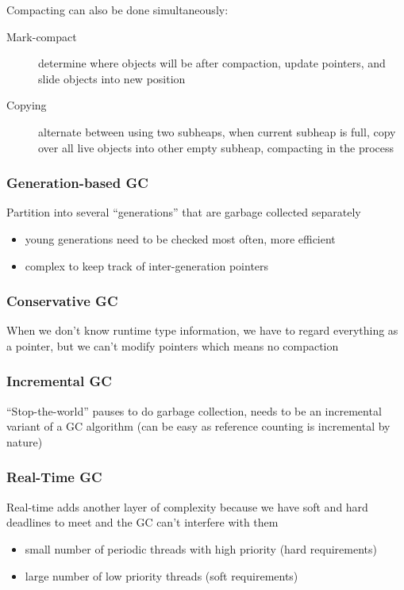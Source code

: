 \documentclass[]{article}
\theoremstyle{definition}
\begin{document}
	Compacting can also be done simultaneously:
	\begin{description}
		\item[Mark-compact] determine where objects will be after compaction, update pointers, and slide objects into new position
		\item[Copying] alternate between using two subheaps, when current subheap is full, copy over all live objects into other empty subheap, compacting in the process
	\end{description}

	\subsubsection{Generation-based GC}
	Partition into several ``generations'' that are garbage collected separately
	\begin{itemize}
		\item young generations need to be checked most often, more efficient
		\item complex to keep track of inter-generation pointers
	\end{itemize}

	\subsubsection{Conservative GC}
	When we don't know runtime type information, we have to regard everything as a pointer, but we can't modify pointers which means no compaction

	\subsubsection{Incremental GC}
	``Stop-the-world'' pauses to do garbage collection, needs to be an incremental variant of a GC algorithm (can be easy as reference counting is incremental by nature)

	\subsubsection{Real-Time GC}
	Real-time adds another layer of complexity because we have soft and hard deadlines to meet and the GC can't interfere with them
	\begin{itemize}
		\item small number of periodic threads with high priority (hard requirements)
		\item large number of low priority threads (soft requirements)
	\end{itemize}
\end{document}
